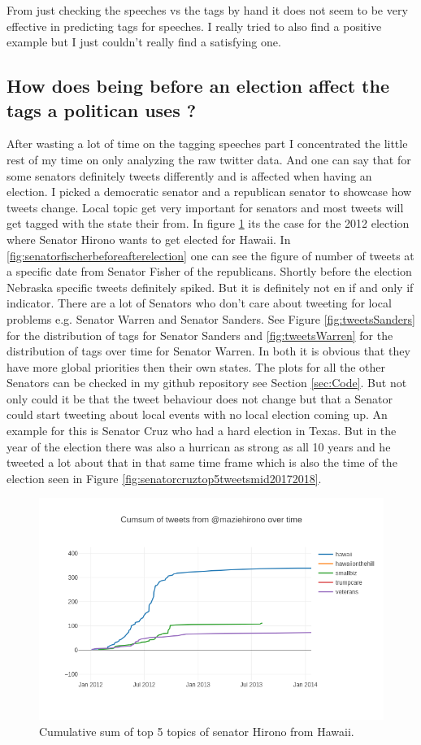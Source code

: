 \documentclass[10pt,conference,compsocconf]{IEEEtran}
\begin{document}
From just checking the speeches vs the tags by hand it does not seem to be very effective in predicting tags for speeches. 
I really tried to also find a positive example but I just couldn't really find a satisfying one.

 
\subsection{How does being before an election affect the tags a politican uses ? }
After wasting a lot of time on the tagging speeches part I concentrated the little rest of my time on only analyzing the raw twitter data. And one can say that for some senators definitely tweets differently and is affected when having an election. I picked a democratic senator and a republican senator to showcase how tweets change. Local topic get very important for senators and most tweets will get tagged with the state their from. In figure \ref{fig:hironobeforeafterelection} its the case for the 2012 election where Senator Hirono wants to get elected for Hawaii. In \ref{fig:senatorfischerbeforeafterelection} one can see the figure of number of tweets at a specific date from Senator Fisher of the republicans. Shortly before the election Nebraska specific tweets definitely spiked. But it is definitely not en if and only if indicator.  There are a lot of Senators who don't care about tweeting for local problems e.g. Senator Warren and Senator Sanders. See Figure \ref{fig:tweetsSanders} for the distribution of tags for Senator Sanders and \ref{fig:tweetsWarren} for the distribution of tags over time for Senator Warren. In both it is obvious that they have more global priorities then their own states. The plots for all the other Senators can be checked in my github repository see Section \ref{sec:Code}. But not only could it be that the tweet behaviour does not change but that a Senator could start tweeting about local events with no local election coming up. An example for this is Senator Cruz who had a hard election in Texas. But in the year of the election there was also a hurrican as strong as all 10 years and he tweeted a lot about that in that same time frame which is also the time of the election seen in Figure \ref{fig:senatorcruztop5tweetsmid20172018}.
 
\begin{figure}
	\centering
	\includegraphics[width=0.7\linewidth]{images/hirono_before_after_election}
	\caption{Cumulative sum of top 5 topics of senator Hirono from Hawaii. }
	\label{fig:hironobeforeafterelection}
\end{figure}
\end{document}
